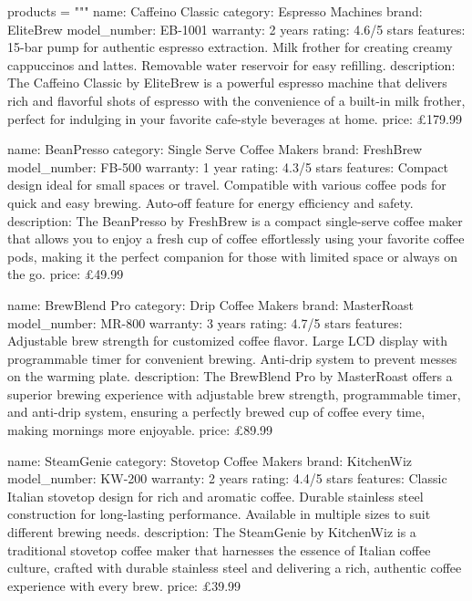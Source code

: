 \documentclass[
  letterpaper,
  DIV=11,
  numbers=noendperiod]{scrreprt}
\newenvironment{Shaded}{\begin{snugshade}}{\end{snugshade}}
\newcommand{\NormalTok}[1]{\textcolor[rgb]{0.00,0.23,0.31}{#1}}
\newcommand{\OperatorTok}[1]{\textcolor[rgb]{0.37,0.37,0.37}{#1}}
\newcommand{\StringTok}[1]{\textcolor[rgb]{0.13,0.47,0.30}{#1}}
\begin{document}
\begin{Shaded}
\begin{Highlighting}[]
\NormalTok{products }\OperatorTok{=} \StringTok{"""}
\StringTok{name: Caffeino Classic}
\StringTok{category: Espresso Machines}
\StringTok{brand: EliteBrew}
\StringTok{model\_number: EB{-}1001}
\StringTok{warranty: 2 years}
\StringTok{rating: 4.6/5 stars}
\StringTok{features:}
\StringTok{  15{-}bar pump for authentic espresso extraction.}
\StringTok{  Milk frother for creating creamy cappuccinos and lattes.}
\StringTok{  Removable water reservoir for easy refilling.}
\StringTok{description: The Caffeino Classic by EliteBrew is a powerful espresso machine that delivers rich and flavorful shots of espresso with the convenience of a built{-}in milk frother, perfect for indulging in your favorite cafe{-}style beverages at home.}
\StringTok{price: £179.99}

\StringTok{name: BeanPresso}
\StringTok{category: Single Serve Coffee Makers}
\StringTok{brand: FreshBrew}
\StringTok{model\_number: FB{-}500}
\StringTok{warranty: 1 year}
\StringTok{rating: 4.3/5 stars}
\StringTok{features:}
\StringTok{  Compact design ideal for small spaces or travel.}
\StringTok{  Compatible with various coffee pods for quick and easy brewing.}
\StringTok{  Auto{-}off feature for energy efficiency and safety.}
\StringTok{description: The BeanPresso by FreshBrew is a compact single{-}serve coffee maker that allows you to enjoy a fresh cup of coffee effortlessly using your favorite coffee pods, making it the perfect companion for those with limited space or always on the go.}
\StringTok{price: £49.99}

\StringTok{name: BrewBlend Pro}
\StringTok{category: Drip Coffee Makers}
\StringTok{brand: MasterRoast}
\StringTok{model\_number: MR{-}800}
\StringTok{warranty: 3 years}
\StringTok{rating: 4.7/5 stars}
\StringTok{features:}
\StringTok{  Adjustable brew strength for customized coffee flavor.}
\StringTok{  Large LCD display with programmable timer for convenient brewing.}
\StringTok{  Anti{-}drip system to prevent messes on the warming plate.}
\StringTok{description: The BrewBlend Pro by MasterRoast offers a superior brewing experience with adjustable brew strength, programmable timer, and anti{-}drip system, ensuring a perfectly brewed cup of coffee every time, making mornings more enjoyable.}
\StringTok{price: £89.99}

\StringTok{name: SteamGenie}
\StringTok{category: Stovetop Coffee Makers}
\StringTok{brand: KitchenWiz}
\StringTok{model\_number: KW{-}200}
\StringTok{warranty: 2 years}
\StringTok{rating: 4.4/5 stars}
\StringTok{features:}
\StringTok{  Classic Italian stovetop design for rich and aromatic coffee.}
\StringTok{  Durable stainless steel construction for long{-}lasting performance.}
\StringTok{  Available in multiple sizes to suit different brewing needs.}
\StringTok{description: The SteamGenie by KitchenWiz is a traditional stovetop coffee maker that harnesses the essence of Italian coffee culture, crafted with durable stainless steel and delivering a rich, authentic coffee experience with every brew.}
\StringTok{price: £39.99}


\end{Highlighting}
\end{Shaded}
\end{document}
